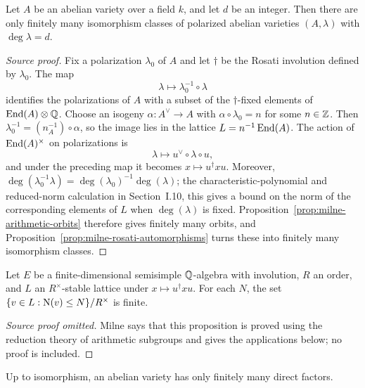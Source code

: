 \begin{theorem}\label{thm:milne-finite-polarizations}
Let $A$ be an abelian variety over a field $k$, and let $d$ be an integer.
Then there are only finitely many isomorphism classes of polarized abelian
varieties $(A,\lambda)$ with $\deg\lambda=d$.
\end{theorem}
\begin{proof}[Source proof]
Fix a polarization $\lambda_0$ of $A$ and let $\dagger$ be the Rosati
involution defined by $\lambda_0$.  The map
\[
\lambda\longmapsto\lambda_0^{-1}\circ\lambda
\]
identifies the polarizations of $A$ with a subset of the $\dagger$-fixed
elements of $\operatorname{End}(A)\otimes\mathbb{Q}$.  Choose an isogeny $\alpha:A^\vee\to A$
with $\alpha\circ\lambda_0=n$ for some $n\in\mathbb{Z}$.  Then
$\lambda_0^{-1}=(n_A^{-1})\circ\alpha$, so the image lies in the lattice
$L=n^{-1}\operatorname{End}(A)$.  The action of $\operatorname{End}(A)^\times$ on polarizations is
\[
\lambda\longmapsto u^\vee\circ\lambda\circ u,
\]
and under the preceding map it becomes $x\mapsto u^\dagger xu$.
Moreover, $\deg(\lambda_0^{-1}\lambda)=\deg(\lambda_0)^{-1}\deg(\lambda)$;
the characteristic-polynomial and reduced-norm calculation in Section~I.10,
this gives a bound on the norm of the corresponding elements of $L$ when
$\deg(\lambda)$ is fixed.  Proposition~\ref{prop:milne-arithmetic-orbits} therefore gives
finitely many orbits, and Proposition~\ref{prop:milne-rosati-automorphisms}
turns these into finitely many isomorphism classes.
\end{proof}
\begin{proposition}\label{prop:milne-arithmetic-orbits}
Let $E$ be a finite-dimensional semisimple $\mathbb{Q}$-algebra with involution, $R$ an order, and $L$ an $R^\times$-stable lattice under $x\mapsto u^\dagger xu$. For each $N$, the set $\{v\in L:\operatorname{N}(v)\le N\}/R^\times$ is finite.
\end{proposition}
\begin{proof}[Source proof omitted]
Milne says that this proposition is proved using the reduction theory of
arithmetic subgroups and gives the applications below; no proof is included.
\end{proof}
\begin{theorem}\label{thm:milne-finite-direct-factors}
Up to isomorphism, an abelian variety has only finitely many direct factors.
\end{theorem}

